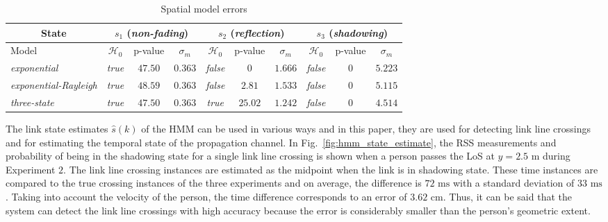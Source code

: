 \documentclass[journal, 10pt, twocolumn, balance]{IEEEtran}
\begin{document}
\begin{table*}[!t]
    \caption{Spatial model errors} \centering \renewcommand{\arraystretch}{1.1}\begin{tabular}{| l l l || c c c | c c c | c c c |} 
	\hline\hline
        \multicolumn{3}{|c||}{State}  & \multicolumn{3}{c|}{$s_1$ (\emph{non-fading})} 
				      &	\multicolumn{3}{c|}{$s_2$ (\emph{reflection})} 
				      & \multicolumn{3}{c|}{$s_3$ (\emph{shadowing})} \\
        \hline 
	{Model} & & & $\mathcal{H}_0$  & p-value & $\sigma_m$ 
				    & $\mathcal{H}_0$  & p-value & $\sigma_m$ 
				    & $\mathcal{H}_0$  & p-value & $\sigma_m$ \\
	\hline 
        \multicolumn{3}{|l||}{\emph{exponential}} & \emph{true} & $47.50$ & $0.363$  
				        & \emph{false} & $0$ & $1.666$
					& \emph{false} & $0$ & $5.223$ \\
					
	\multicolumn{3}{|l||}{\emph{exponential-Rayleigh}} & \emph{true} & $48.59$ & $0.363$  
				        & \emph{false} & $2.81$ & $1.533$
					& \emph{false} & $0$ & $5.115$ \\
					
	\multicolumn{3}{|l||}{\emph{three-state}} & \emph{true} & $47.50$ & $0.363$  
				        & \emph{true} & $25.02$ & $1.242$
					& \emph{false} & $0$ & $4.514$ \\
        \hline \end{tabular}
        \label{table:model_errors} \end{table*}

The link state estimates $\hat{s}(k)$ of the HMM can be used in various ways and in this paper, they are used for detecting link line crossings and for estimating the temporal state of the propagation channel. In Fig.~\ref{fig:hmm_state_estimate}, the RSS measurements and probability of being in the shadowing state for a single link line crossing is shown when a person passes the LoS at $y = 2.5 \text{ m}$ during Experiment $2$. The link line crossing instances are estimated as the midpoint when the link is in shadowing state. These time instances are compared to the true crossing instances of the three experiments and on average, the difference is $72 \text{ ms}$ with a standard deviation of $33 \text{ ms}$. Taking into account the velocity of the person, the time difference corresponds to an error of $3.62 \text{ cm}$. Thus, it can be said that the system can detect the link line crossings with high accuracy because the error is considerably smaller than the person's geometric extent.
\end{document}

